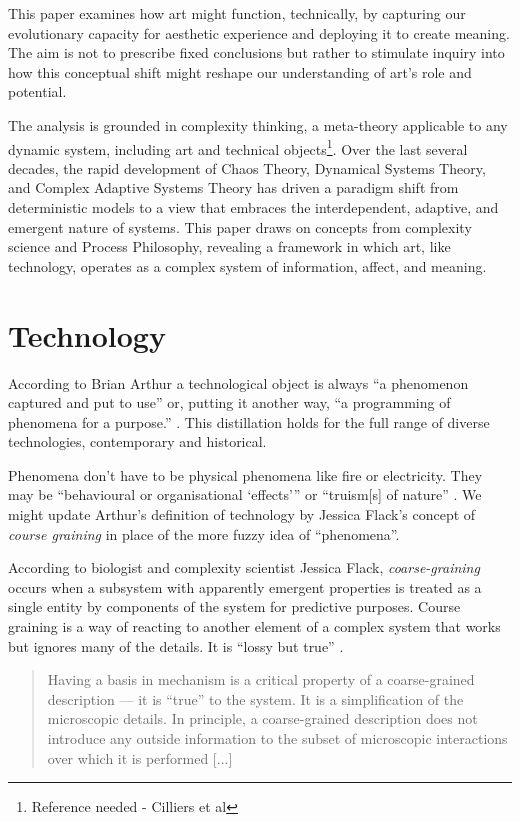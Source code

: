\documentclass[letterpaper]{article}
\begin{document}
    This paper examines how art might function, technically, by capturing our evolutionary capacity for aesthetic experience and deploying it to create meaning. The aim is not to prescribe fixed conclusions but rather to stimulate inquiry into how this conceptual shift might reshape our understanding of art's role and potential.

    The analysis is grounded in complexity thinking, a meta-theory applicable to any dynamic system, including art and technical objects\footnote{Reference needed - Cilliers et al}. Over the last several decades, the rapid development of Chaos Theory, Dynamical Systems Theory, and Complex Adaptive Systems Theory has driven a paradigm shift from deterministic models to a view that embraces the interdependent, adaptive, and emergent nature of systems. This paper draws on concepts from complexity science and Process Philosophy, revealing a framework in which art, like technology, operates as a complex system of information, affect, and meaning.
    
\section{Technology}

    According to Brian Arthur a technological object is always “a phenomenon captured and put to use” \citep[p.53]{theNatureOfTechnology2009} or, putting it another way, “a programming of phenomena for a purpose.” \citep[p.53]{theNatureOfTechnology2009}. This distillation holds for the full range of diverse technologies, contemporary and historical.

    Phenomena don't have to be physical phenomena like fire or electricity. They may be “behavioural or organisational ‘effects’” \citep[p.55]{theNatureOfTechnology2009} or “truism[s] of nature” \citep[p.45]{theNatureOfTechnology2009}. We might update Arthur's definition of technology by Jessica Flack's concept of \emph{course graining} in place of the more fuzzy idea of “phenomena”. 

    According to biologist and complexity scientist Jessica Flack, \emph{coarse-graining} occurs when a subsystem with apparently emergent properties is treated as a single entity by components of the system for predictive purposes. Course graining is a way of reacting to another element of a complex system that works but ignores many of the details. It is “lossy but true” \citep[p.4]{FlackCrsGrnng2017}.

    \begin{quote}
        Having a basis in mechanism is a critical property of a coarse-grained description — it is “true” to the system. It is a simplification of the microscopic details. In principle, a coarse-grained description does not introduce any outside information to the subset of microscopic interactions over which it is performed [...] \citep[p.4]{FlackCrsGrnng2017}
    \end{quote}
\end{document}
